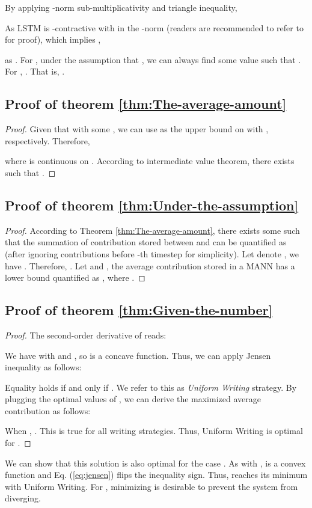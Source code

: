 By applying -norm sub-multiplicativity and triangle inequality,



As LSTM is -contractive with  in the -norm
(readers are recommended to refer to \cite{miller2018recurrent} for
proof), which implies ,

as . For , under the assumption
that , we can always
find some value  such that . For
, . That is,
.

\subsection{Proof of theorem \ref{thm:The-average-amount}\label{subsec:Proof-of-theorem-1}}
\begin{proof}
Given that  with some ,
we can use  as the upper bound on 
with , respectively. Therefore,


where  is
continuous on . According to intermediate value theorem,
there exists  such that .
\end{proof}

\subsection{Proof of theorem \ref{thm:Under-the-assumption}\label{subsec:Proof-of-theorem-2}}
\begin{proof}
According to Theorem \ref{thm:The-average-amount}, there exists some
such that the summation of contribution
stored between  and  can be quantified as 
(after ignoring contributions before -th timestep for simplicity).
Let denote ,
we have .
Therefore, .
Let  and ,
the average contribution stored in a MANN has a lower bound quantified
as , where .
\end{proof}

\subsection{Proof of theorem \ref{thm:Given-the-number}\label{subsec:Proof-of-theorem}}
\begin{proof}
The second-order derivative of  reads:



We have  with 
and , so  is a concave function.
Thus, we can apply Jensen inequality as follows: 

Equality holds if and only if .
We refer to this as\textit{ Uniform Writing} strategy. By plugging
the optimal values of , we can derive the maximized average
contribution as  follows:


When , .
This is true for all writing strategies. Thus, Uniform Writing is
optimal for .
\end{proof}
We can show that this solution is also optimal for the case .
As  with ,
 is a convex function and Eq. (\ref{eq:jensen})
flips the inequality sign. Thus,  reaches its minimum
with Uniform Writing. For , minimizing 
is desirable to prevent the system from diverging. 

